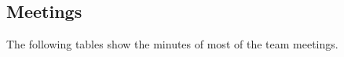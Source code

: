 \begin{appendix}


\chapter{Meetings}\label{ch:Meetings}
The following tables show the minutes of most of the team meetings.


\end{appendix}
